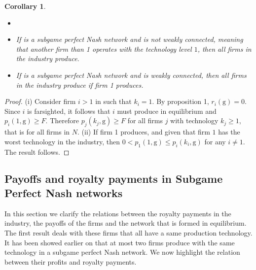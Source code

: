 \documentclass{article}
\newtheorem{corollary}{Corollary}
\begin{document}
 \begin{corollary}\label{connectednessproperties}
 \begin{itemize}
     \item[]
     \item[(i)] If  is a subgame perfect Nash network and  is not weakly connected, meaning that another firm than 1 operates with the technology level $1$, then all firms in the industry produce. 
     \item[(ii)] If  is a subgame perfect Nash network and  is weakly connected, then all firms in the industry produce if firm 1 produces. 
\end{itemize}
 \end{corollary}
 \begin{proof}
 (i) Consider firm $i>1$ in  such that $k_i=1$. By proposition 1, $r_i(\text{g})=0$. Since $i$ is farsighted, it follows that $i$ must produce in equilibrium and $p_i(1,\text{g})\geq F$. Therefore $p_j(k_j,\text{g})\geq F$ for all firms $j$ with technology $k_j\geq 1$, that is for all firms in $N$. (ii) If firm 1 produces, and given that firm $1$ has the worst technology in the industry, then $0< p_1(1,\text{g})\leq p_i(k_i,\text{g})$ for any $i\neq 1$. The result follows.    
 \end{proof}
 

 \subsection{Payoffs and royalty payments in Subgame Perfect Nash networks}
 
In this section we clarify the relations between the royalty payments in the industry, the payoffs of the firms and the network that is formed in equilibrium. The first result deals with these firms that all have a same production technology. It has been showed earlier on that at most two firms produce with the same technology in a subgame perfect Nash network. We now highlight the relation between their profits and royalty payments. \\
\end{document}
